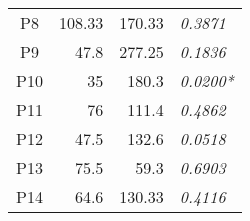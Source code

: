 \begin{table}[]
\begin{tabular}{crrl}
P8                   & 108.33                                                                                                & 170.33                                                                                                   & \textit{0.3871}   \\
P9                   & 47.8                                                                                                  & 277.25                                                                                                   & \textit{0.1836}   \\
P10                  & 35                                                                                                    & 180.3                                                                                                    & \textit{0.0200*} \\
P11                  & 76                                                                                                    & 111.4                                                                                                    & \textit{0.4862}   \\
P12                  & 47.5                                                                                                  & 132.6                                                                                                    & \textit{0.0518} \\
P13                  & 75.5                                                                                                  & 59.3                                                                                                     & \textit{0.6903}   \\
P14                  & 64.6                                                                                                  & 130.33                                                                                                   & \textit{0.4116}  \\
\bottomrule
\end{tabular}
\end{table}


